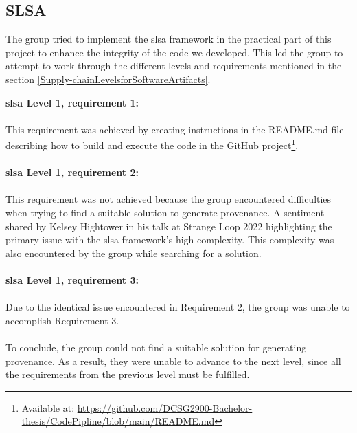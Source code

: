 \subsection{SLSA}
The group tried to implement the \acrshort{slsa} framework in the practical part of this project to enhance the integrity of the code we developed. This led the group to attempt to work through the different levels and requirements mentioned in the section \ref{Supply-chainLevelsforSoftwareArtifacts}.

\textbf{\acrshort{slsa} Level 1, requirement 1:}
\textit{} \cite{SLSAlevels}
\\~\\
This requirement was achieved by creating instructions in the README.md file describing how to build and execute the code in the GitHub project\footnote{Available at: \url{https://github.com/DCSG2900-Bachelor-thesis/CodePipline/blob/main/README.md}}. 
\\~\\
\textbf{\acrshort{slsa} Level 1, requirement 2:}
\textit{} \cite{SLSAlevels}
\\~\\
This requirement was not achieved because the group encountered difficulties when trying to find a suitable solution to generate \gls{provenance}. A sentiment shared by Kelsey Hightower in his talk at Strange Loop 2022 \cite{The-Secure-Software-Supply-Chain} highlighting the primary issue with the \acrshort{slsa} framework's high complexity. This complexity was also encountered by the group while searching for a solution.
\\~\\
\textbf{\acrshort{slsa} Level 1, requirement 3:}
\textit{} \cite{SLSAlevels}
\\~\\
Due to the identical issue encountered in Requirement 2, the group was unable to accomplish Requirement 3.
\\~\\
To conclude, the group could not find a suitable solution for generating \gls{provenance}. As a result, they were unable to advance to the next level, since all the requirements from the previous level must be fulfilled.


